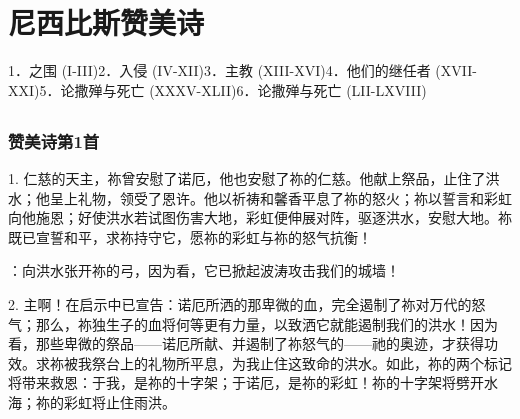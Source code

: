 
\chapter{尼西比斯赞美诗}


1．之围 (I-III)\newline{}2．入侵 (IV-XII)\newline{}3．主教 (XIII-XVI)\newline{}4．他们的继任者 (XVII-XXI)\newline{}5．论撒殚与死亡 (XXXV-XLII)\newline{}6．论撒殚与死亡 (LII-LXVIII)\par



\section{}


\subsection{赞美诗第1首}

1. 仁慈的天主，祢曾安慰了诺厄，他也安慰了祢的仁慈。他献上祭品，止住了洪水；他呈上礼物，领受了恩许。他以祈祷和馨香平息了祢的怒火；祢以誓言和彩虹向他施恩；好使洪水若试图伤害大地，彩虹便伸展对阵，驱逐洪水，安慰大地。祢既已宣誓和平，求祢持守它，愿祢的彩虹与祢的怒气抗衡！\par

：向洪水张开祢的弓，因为看，它已掀起波涛攻击我们的城墙！\par

2. 主啊！在启示中已宣告：诺厄所洒的那卑微的血，完全遏制了祢对万代的怒气；那么，祢独生子的血将何等更有力量，以致洒它就能遏制我们的洪水！因为看，那些卑微的祭品——诺厄所献、并遏制了祢怒气的——祂的奥迹，才获得功效。求祢被我祭台上的礼物所平息，为我止住这致命的洪水。如此，祢的两个标记将带来救恩：于我，是祢的十字架；于诺厄，是祢的彩虹！祢的十字架将劈开水海；祢的彩虹将止住雨洪。\par


